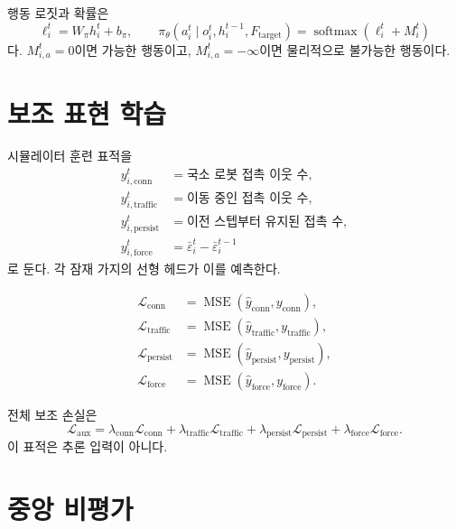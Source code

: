 \documentclass[11pt,a4paper]{article}
\newcommand{\Ftarget}{F_{\mathrm{target}}}
\newcommand{\softmax}{\operatorname{softmax}}
\newcommand{\MSE}{\operatorname{MSE}}
\begin{document}
행동 로짓과 확률은
\begin{equation}
  \ell_i^t=W_\pi h_i^t+b_\pi,
  \qquad
  \pi_\theta(a_i^t\mid o_i^t,h_i^{t-1},\Ftarget)
  =
  \softmax(\ell_i^t+M_i^t)
  \label{eq:policy-head}
\end{equation}
다. \(M_{i,a}^t=0\)이면 가능한 행동이고,
\(M_{i,a}^t=-\infty\)이면 물리적으로 불가능한 행동이다.

\section{보조 표현 학습}

시뮬레이터 훈련 표적을
\begin{align}
  y_{i,\mathrm{conn}}^t
    &=\text{국소 로봇 접촉 이웃 수},\\
  y_{i,\mathrm{traffic}}^t
    &=\text{이동 중인 접촉 이웃 수},\\
  y_{i,\mathrm{persist}}^t
    &=\text{이전 스텝부터 유지된 접촉 수},\\
  y_{i,\mathrm{force}}^t
    &=\bar\varepsilon_i^t-\bar\varepsilon_i^{t-1}
\end{align}
로 둔다. 각 잠재 가지의 선형 헤드가 이를 예측한다.

\begin{align}
  \mathcal{L}_{\mathrm{conn}}
    &=\MSE(\widehat y_{\mathrm{conn}},y_{\mathrm{conn}}),\\
  \mathcal{L}_{\mathrm{traffic}}
    &=\MSE(\widehat y_{\mathrm{traffic}},y_{\mathrm{traffic}}),\\
  \mathcal{L}_{\mathrm{persist}}
    &=\MSE(\widehat y_{\mathrm{persist}},y_{\mathrm{persist}}),\\
  \mathcal{L}_{\mathrm{force}}
    &=\MSE(\widehat y_{\mathrm{force}},y_{\mathrm{force}}).
\end{align}

전체 보조 손실은
\begin{equation}
  \mathcal{L}_{\mathrm{aux}}=
  \lambda_{\mathrm{conn}}\mathcal{L}_{\mathrm{conn}}
  +\lambda_{\mathrm{traffic}}\mathcal{L}_{\mathrm{traffic}}
  +\lambda_{\mathrm{persist}}\mathcal{L}_{\mathrm{persist}}
  +\lambda_{\mathrm{force}}\mathcal{L}_{\mathrm{force}}.
  \label{eq:auxiliary-loss}
\end{equation}
이 표적은 추론 입력이 아니다.

\section{중앙 비평가}
\end{document}
